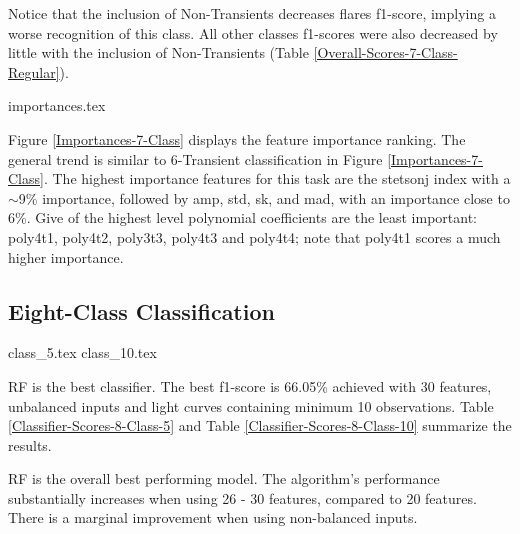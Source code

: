 \documentclass[a4paper,fleqn,usenatbib]{mnras}
\begin{document}
Notice that the inclusion of Non-Transients decreases flares f1-score,
implying a worse recognition of this class. All other classes
f1-scores were also decreased by little with the inclusion of
Non-Transients (Table \ref{Overall-Scores-7-Class-Regular}). 


{importances.tex}

Figure \ref{Importances-7-Class} displays the feature importance
ranking. 
The general trend is similar to 6-Transient classification in Figure
\ref{Importances-7-Class}. 
The highest importance features for this task are the
stetson\textunderscore j index with a $\sim$9\% importance, followed by
amp, std, sk, and mad, with an importance close to 6\%. 
Give of the highest level polynomial coefficients are the least
important: poly4\textunderscore t1, poly4\textunderscore t2,
poly3\textunderscore t3, poly4\textunderscore t3 and
poly4\textunderscore t4; note that poly4\textunderscore t1 scores a
much higher importance.  





\subsection{Eight-Class Classification}

{class_5.tex}
{class_10.tex}


RF is the best classifier. The best f1-score is 66.05\% achieved with
30 features, unbalanced inputs and light curves containing minimum 10
observations.  
Table \ref{Classifier-Scores-8-Class-5} and Table
\ref{Classifier-Scores-8-Class-10} summarize the results.

RF is the overall best performing model.
The algorithm's performance substantially increases when using 26 -
30 features, compared to 20 features.
There is a marginal improvement when using non-balanced inputs. 
\end{document}
